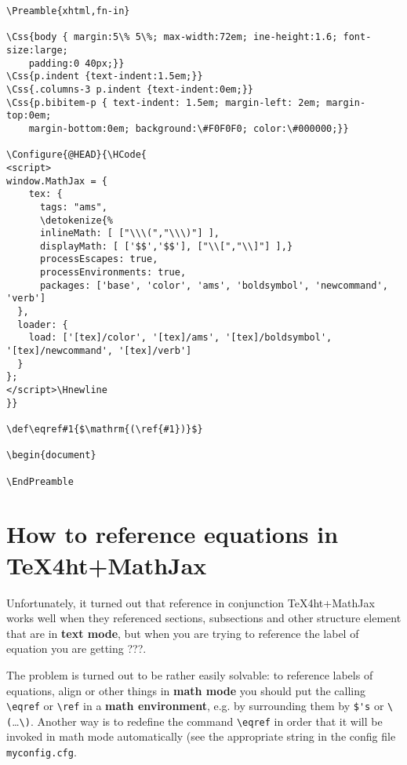 \documentclass{article}
\begin{document}
{\small
\begin{verbatim}
\Preamble{xhtml,fn-in}

\Css{body { margin:5\% 5\%; max-width:72em; ine-height:1.6; font-size:large;
    padding:0 40px;}}
\Css{p.indent {text-indent:1.5em;}}
\Css{.columns-3 p.indent {text-indent:0em;}}
\Css{p.bibitem-p { text-indent: 1.5em; margin-left: 2em; margin-top:0em;
    margin-bottom:0em; background:\#F0F0F0; color:\#000000;}}

\Configure{@HEAD}{\HCode{
<script>
window.MathJax = {
    tex: {
      tags: "ams",
      \detokenize{%
      inlineMath: [ ["\\\(","\\\)"] ],
      displayMath: [ ['$$','$$'], ["\\[","\\]"] ],}
      processEscapes: true,
      processEnvironments: true,
      packages: ['base', 'color', 'ams', 'boldsymbol', 'newcommand', 'verb']
  },
  loader: {
    load: ['[tex]/color', '[tex]/ams', '[tex]/boldsymbol', '[tex]/newcommand', '[tex]/verb']
  }
};
</script>\Hnewline
}}

\def\eqref#1{$\mathrm{(\ref{#1})}$}

\begin{document}

\EndPreamble
\end{verbatim}}

\section{How to reference equations in TeX4ht+MathJax}\label{S2}
Unfortunately, it turned out that reference in conjunction TeX4ht+MathJax
works well when they referenced sections, subsections and other structure
element that are in \textbf{text mode}, but when you are trying to reference
the label of equation you are getting ???.

The problem is turned out to be rather easily solvable: to reference labels
of equations, align or other things in \textbf{math mode} you should put the
calling \verb|\eqref| or \verb|\ref| in a \textbf{math environment}, e.g. by
surrounding them by \verb|$'s| or \verb|\(|\ldots\verb|\)|. Another way is to
redefine the command \verb|\eqref| in order that it will be invoked in math
mode automatically (see the appropriate string in the config file
\verb|myconfig.cfg|.
\end{document}
